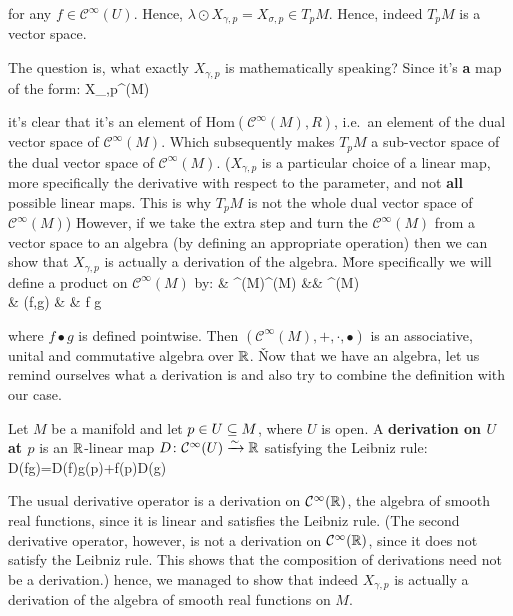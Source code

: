 for any $f\in \mathcal{C}^\infty(U)$. Hence, $\lambda \odot X_{\gamma,p}=X_{\sigma,p}\in T_p M$. Hence, indeed $T_p M$ is a vector space. \qedhere
\een
\eq

The question is, what exactly $X_{\gamma,p}$ is mathematically speaking? Since it's \textbf{a} map of the form:
X_{\gamma,p}\cl {}^\infty(M) \xrightarrow{\sim} \R
\ei

it's clear that it's an element of $\mathrm{Hom}(\mathcal{C}^\infty(M),R)$, i.e.\ an element of the dual vector space
of $\mathcal{C}^\infty(M)$. Which subsequently makes $T_p M$ a sub-vector space of the dual vector space of
$\mathcal{C}^\infty(M)$. ($X_{\gamma,p}$ is a particular choice of a linear map, more specifically the derivative
with respect to the parameter, and not \textbf{all} possible linear maps. This is why $T_p M$ is not the whole dual
vector space of $\mathcal{C}^\infty(M)$) \v

However, if we take the extra step and turn the $\mathcal{C}^\infty(M)$ from a vector space to an algebra (by
defining an appropriate operation) then we can show that $X_{\gamma,p}$ is actually a derivation of the algebra. \v

More specifically we will define a product on $\mathcal{C}^\infty(M)$ by:
\bullet \cl & ^\infty(M)\times {}^\infty(M) &\to& ^\infty(M)\\
& (f,g) & \mapsto & f \bullet g
\ei

where $f \bullet g$ is defined pointwise. Then $(\mathcal{C}^\infty(M),+,\cdot,\bullet)$ is an associative, unital
and commutative algebra over $\mathbb{R}$. \v

Now that we have an algebra, let us remind ourselves what a derivation is and also try to combine the definition with
our case.

Let $M$ be a manifold and let $p\in U \subseteq M$, where $U$ is open. A \textbf{derivation on $U$ at $p$} is an $\mathbb{R}$-linear
map $D\colon \mathcal{C}^\infty(U)\xrightarrow{\sim}\mathbb{R}$ satisfying the Leibniz rule:
\bse
D(fg)=D(f)g(p)+f(p)D(g)
\ese
\ed

The usual derivative operator is a derivation on $\mathcal{C}^\infty(\mathbb{R})$, the algebra of smooth real functions,
since it is linear and satisfies the Leibniz rule. (The second derivative operator, however, is not a derivation on
$\mathcal{C}^\infty(\mathbb{R})$, since it does not satisfy the Leibniz rule. This shows that the composition of derivations
need not be a derivation.) hence, we managed to show that indeed $X_{\gamma,p}$ is actually a derivation of the
algebra of smooth real functions on $M$.

